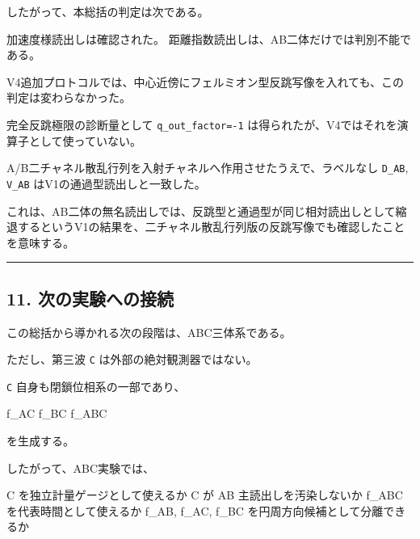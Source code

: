 \documentclass[
]{article}
\newenvironment{Shaded}{}{}
\newcommand{\NormalTok}[1]{#1}
\begin{document}
したがって、本総括の判定は次である。

\begin{Shaded}
\begin{Highlighting}[]
\NormalTok{加速度様読出しは確認された。}
\NormalTok{距離指数読出しは、AB二体だけでは判別不能である。}
\end{Highlighting}
\end{Shaded}

V4追加プロトコルでは、中心近傍にフェルミオン型反跳写像を入れても、この判定は変わらなかった。

完全反跳極限の診断量として \texttt{q\_out\_factor=-1}
は得られたが、V4ではそれを演算子として使っていない。

A/B二チャネル散乱行列を入射チャネルへ作用させたうえで、ラベルなし
\texttt{D\_AB}, \texttt{V\_AB} はV1の通過型読出しと一致した。

これは、AB二体の無名読出しでは、反跳型と通過型が同じ相対読出しとして縮退するというV1の結果を、二チャネル散乱行列版の反跳写像でも確認したことを意味する。

\begin{center}\rule{0.5\linewidth}{0.5pt}\end{center}

\subsection{11.
次の実験への接続}\label{ux6b21ux306eux5b9fux9a13ux3078ux306eux63a5ux7d9a}

この総括から導かれる次の段階は、ABC三体系である。

ただし、第三波 \texttt{C} は外部の絶対観測器ではない。

\texttt{C} 自身も閉鎖位相系の一部であり、

\begin{Shaded}
\begin{Highlighting}[]
\NormalTok{f\_AC}
\NormalTok{f\_BC}
\NormalTok{f\_ABC}
\end{Highlighting}
\end{Shaded}

を生成する。

したがって、ABC実験では、

\begin{Shaded}
\begin{Highlighting}[]
\NormalTok{C を独立計量ゲージとして使えるか}
\NormalTok{C が AB 主読出しを汚染しないか}
\NormalTok{f\_ABC を代表時間として使えるか}
\NormalTok{f\_AB, f\_AC, f\_BC を円周方向候補として分離できるか}
\end{Highlighting}
\end{Shaded}
\end{document}
